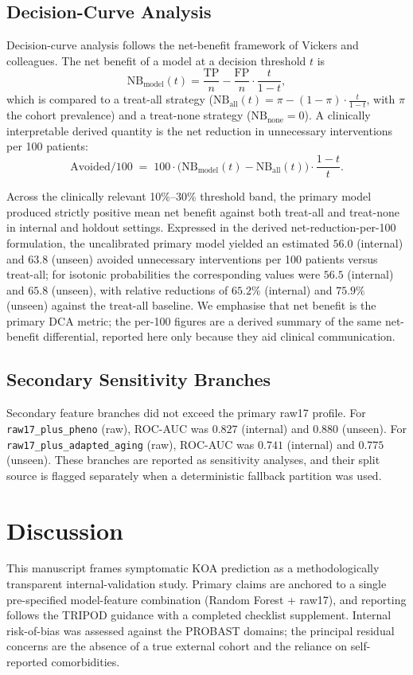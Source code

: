 \documentclass[11pt,a4paper]{article}
\begin{document}
\subsection{Decision-Curve Analysis}
Decision-curve analysis follows the net-benefit framework of Vickers and colleagues\cite{Vickers2006,Vickers2016}. The net benefit of a model at a decision threshold $t$ is
\[
\mathrm{NB}_{\text{model}}(t) = \frac{\mathrm{TP}}{n} - \frac{\mathrm{FP}}{n} \cdot \frac{t}{1-t},
\]
\noindent which is compared to a treat-all strategy ($\mathrm{NB}_{\text{all}}(t) = \pi - (1-\pi)\cdot\tfrac{t}{1-t}$, with $\pi$ the cohort prevalence) and a treat-none strategy ($\mathrm{NB}_{\text{none}}=0$). A clinically interpretable derived quantity is the net reduction in unnecessary interventions per 100 patients\cite{Vickers2016}:
\[
\mathrm{Avoided}/100 \;=\; 100 \cdot \bigl(\mathrm{NB}_{\text{model}}(t) - \mathrm{NB}_{\text{all}}(t)\bigr) \cdot \frac{1-t}{t}.
\]

Across the clinically relevant 10\%--30\% threshold band, the primary model produced strictly positive mean net benefit against both treat-all and treat-none in internal and holdout settings. Expressed in the derived net-reduction-per-100 formulation, the uncalibrated primary model yielded an estimated $56.0$ (internal) and $63.8$ (unseen) avoided unnecessary interventions per 100 patients versus treat-all; for isotonic probabilities the corresponding values were $56.5$ (internal) and $65.8$ (unseen), with relative reductions of $65.2\%$ (internal) and $75.9\%$ (unseen) against the treat-all baseline. We emphasise that net benefit is the primary DCA metric; the per-100 figures are a derived summary of the same net-benefit differential, reported here only because they aid clinical communication.

\subsection{Secondary Sensitivity Branches}
Secondary feature branches did not exceed the primary raw17 profile. For \texttt{raw17\_plus\_pheno} (raw), ROC-AUC was $0.827$ (internal) and $0.880$ (unseen). For \texttt{raw17\_plus\_adapted\_aging} (raw), ROC-AUC was $0.741$ (internal) and $0.775$ (unseen). These branches are reported as sensitivity analyses, and their split source is flagged separately when a deterministic fallback partition was used.

\section{Discussion}
This manuscript frames symptomatic KOA prediction as a methodologically transparent internal-validation study. Primary claims are anchored to a single pre-specified model-feature combination (Random Forest + raw17), and reporting follows the TRIPOD guidance\cite{Collins2015} with a completed checklist supplement. Internal risk-of-bias was assessed against the PROBAST domains\cite{Wolff2019}; the principal residual concerns are the absence of a true external cohort and the reliance on self-reported comorbidities.
\end{document}
